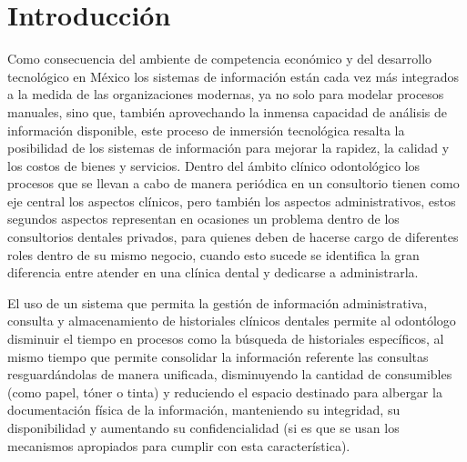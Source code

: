 \pagebreak
\setcounter{page}{1}
\pagestyle{fancy}

\section{Introducción}

Como consecuencia del ambiente de competencia económico y del desarrollo tecnológico en México los sistemas de información están cada vez más integrados a la medida de las organizaciones modernas, ya no solo para modelar procesos manuales, sino que, también aprovechando la inmensa capacidad de análisis de información disponible, este proceso de inmersión tecnológica resalta la posibilidad de los sistemas de información para mejorar la rapidez, la calidad y los costos de bienes y servicios. Dentro del ámbito clínico odontológico los procesos que se llevan a cabo de manera periódica en un consultorio tienen como eje central los aspectos clínicos, pero también los aspectos administrativos, estos segundos aspectos representan en ocasiones un problema dentro de los consultorios dentales privados, para quienes deben de hacerse cargo de diferentes roles dentro de su mismo negocio, cuando esto sucede se identifica la gran diferencia entre atender en una clínica dental y dedicarse a administrarla.

\vspace{1em}

El uso de un sistema que permita la gestión de información administrativa, consulta y almacenamiento de historiales clínicos dentales permite al odontólogo disminuir el tiempo en procesos como la búsqueda de historiales específicos, al mismo tiempo que permite consolidar la información referente las consultas resguardándolas de manera unificada, disminuyendo la cantidad de consumibles (como papel, tóner o tinta) y reduciendo el espacio destinado para albergar la documentación física de la información, manteniendo su integridad, su disponibilidad y aumentando su confidencialidad (si es que se usan los mecanismos apropiados para cumplir con esta característica).

\vspace{1em}

